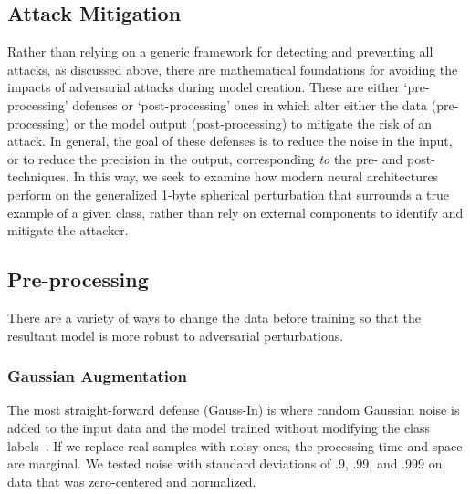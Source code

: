 \documentclass[journal]{IEEEtran}
\newcommand{\tl}[1]{\textit{[{\color{red}#1}]}}
\newcommand{\cm}[1]{\textit{{\color{blue}#1}}}
\begin{document}
\subsection{Attack Mitigation}

Rather than relying on a generic framework for detecting and preventing all attacks, as discussed above, there are mathematical foundations for avoiding the impacts of adversarial attacks during model creation. These are either `pre-processing' defenses or `post-processing' ones in which alter either the data (pre-processing) or the model output (post-processing) to mitigate the risk of an attack. In general, the goal of these defenses is to reduce the noise in the input, or to reduce the precision in the output, corresponding \cm{to} the pre- and post- techniques. In this way, we seek to examine how modern neural architectures perform on the generalized 1-byte spherical perturbation that surrounds a true example of a given class, rather than rely on external components to identify and mitigate the attacker.


\subsection{Pre-processing}
\label{pre-processing}
There are a variety of ways to change the data before training so that the resultant model is more robust to adversarial perturbations.


\subsubsection{Gaussian Augmentation}
The most straight-forward defense (Gauss-In) is where random Gaussian noise is added to the input data and the model trained without modifying the class labels~\cite{gauss_aug}. If we replace real samples with noisy ones, the processing time and space are marginal. We tested noise with standard deviations of .9, .99, and .999 on data that was zero-centered and normalized.




\end{document}
